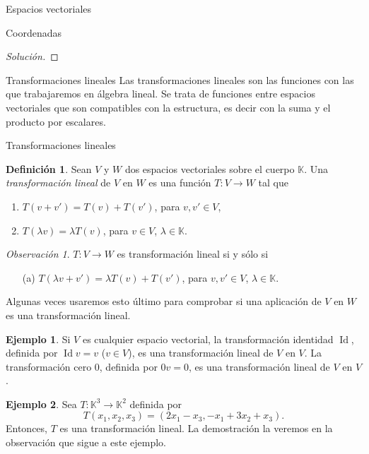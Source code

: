 \documentclass[a4paper,12pt,twoside,spanish,reqno]{amsbook}
\theoremstyle{definition}
\newtheorem{definicion}{Definici\'on}[section]
\newtheorem{ejemplo}{Ejemplo}[section]
\theoremstyle{remark}
\newtheorem{obs}{Observaci\'on}[section]
\newcommand{\Id}{\operatorname{Id}}
\newcommand{\K}{\mathbb K}
\begin{document}
\begin{chapter}{Espacios vectoriales}
\begin{section}{Coordenadas}
\begin{proof}[Solución]
	  
\end{proof}
	
	\end{section}

	\end{chapter}
	
		
	\begin{chapter}{Transformaciones lineales}\label{chap-trans-lin}
		Las transformaciones lineales son las funciones con las que trabajaremos en álgebra lineal. Se trata de funciones entre espacios vectoriales que son compatibles con la estructura,  es decir con la suma y el producto por escalares.
		
		
		\begin{section}{Transformaciones lineales}
			\begin{definicion}
				Sean $V$ y $W$ dos espacios vectoriales sobre el cuerpo $\K$. Una 				\textit{transformación lineal} de $V$ en $W$ es una función $T:V \to W$  tal que
				\begin{enumerate}
					\item $T(v+v') = T(v)+ T(v')$, para $v,v' \in V$,
					\item $T(\lambda v) = \lambda T(v)$, para $v \in V$, $\lambda \in \K$.
				\end{enumerate}
			\end{definicion}
		
			\begin{obs}
				$T:V \to W$ es transformación lineal si y sólo si
				\begin{enumerate}
					\item[({a})]  $T(\lambda v+v') = \lambda T(v)+ T(v')$, para $v,v' \in V$, $\lambda \in \K$.
				\end{enumerate}
			Algunas veces usaremos esto último para comprobar si una aplicación de $V$ en $W$ es una transformación lineal. 
			\end{obs}
			
			\begin{ejemplo}
				Si $V$ es cualquier espacio vectorial, la transformación identidad $\Id$, definida por $\Id v = v$ ($v \in V$), es una transformación lineal de $V$ en $V$. La transformación cero $0$, definida por $0v = 0$, es una transformación lineal de $V$ en $V$.
			\end{ejemplo}
		
			\begin{ejemplo}\label{ejemplo-lineal-3}
				Sea $T : \K^3 \to \K^2$ definida por
				$$
				T(x_1,x_2,x_3) = (2x_1 - x_3, -x_1+3x_2+x_3).
				$$
				Entonces, $T$  es una transformación lineal. La demostración la veremos en la observación que sigue a este ejemplo. 
				

\end{ejemplo}
\end{section}
\end{chapter}
\end{document}
